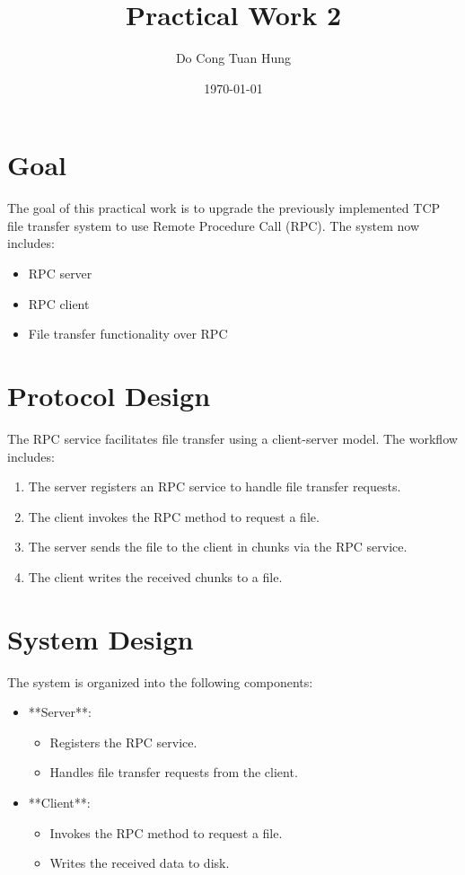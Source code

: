 \documentclass[a4paper,12pt]{article}
\title{Practical Work 2}
\author{Do Cong Tuan Hung}
\date{\today}
\begin{document}
\maketitle

\section*{Goal}
The goal of this practical work is to upgrade the previously implemented TCP file transfer system to use Remote Procedure Call (RPC). The system now includes:
\begin{itemize}
    \item RPC server
    \item RPC client
    \item File transfer functionality over RPC
\end{itemize}

\section*{Protocol Design}
The RPC service facilitates file transfer using a client-server model. The workflow includes:
\begin{enumerate}
    \item The server registers an RPC service to handle file transfer requests.
    \item The client invokes the RPC method to request a file.
    \item The server sends the file to the client in chunks via the RPC service.
    \item The client writes the received chunks to a file.
\end{enumerate}

\section*{System Design}
The system is organized into the following components:
\begin{itemize}
    \item **Server**:
          \begin{itemize}
              \item Registers the RPC service.
              \item Handles file transfer requests from the client.
          \end{itemize}
    \item **Client**:
          \begin{itemize}
              \item Invokes the RPC method to request a file.
              \item Writes the received data to disk.
          \end{itemize}
\end{itemize}
\end{document}
